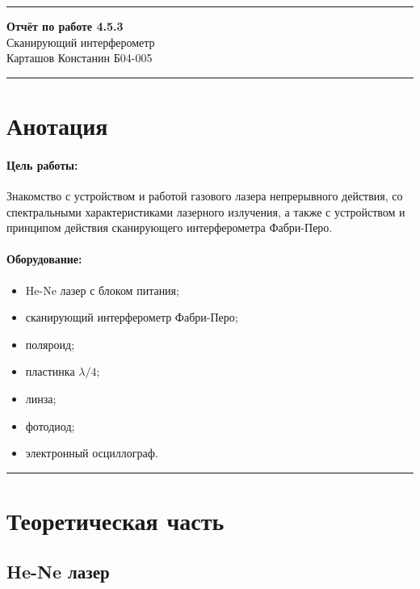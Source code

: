 \documentclass[a4paper,12pt]{article} %
\begin{document}


\hrule 	
\medskip
\begin{raggedright}
{\large \textbf{Отчёт по работе 4.5.3}}
\\
\medskip
{\Large Сканирующий интерферометр} 
\\
\medskip
{\large Карташов Констанин Б04-005}
\medskip
\hrule
\medskip
\end{raggedright}


\section{Анотация}

\paragraph{Цель работы:} 
Знакомство с устройством и работой газового лазера непрерывного действия, со спектральными характеристиками лазерного излучения, а также с устройством и принципом действия сканирующего интерферометра Фабри-Перо.

\paragraph{Оборудование:}
\begin{itemize}
\renewcommand{\labelitemi}{$\triangleright$}
\itemsep-0.5em
\item He-Ne лазер с блоком питания;
\item сканирующий интерферометр Фабри-Перо;
\item поляроид;
\item пластинка $\lambda/4$;
\item линза;
\item фотодиод;
\item электронный осциллограф.
\end{itemize}


\medskip\hrule\medskip

\FloatBarrier

\section{Теоретическая часть}

\subsection{He-Ne лазер}
\end{document}
